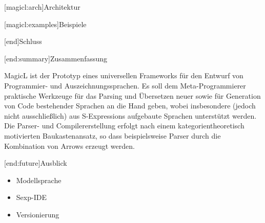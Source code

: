 \documentclass[a4paper, bibgerm]{article}
\newcommand\lsection{}
\newcommand\lsubsection{}
\begin{document}
\lsubsection[magicl:arch]{Architektur}

\lsubsection[magicl:examples]{Beispiele}

\lsection[end]{Schluss}

\lsubsection[end:summary]{Zusammenfassung}

MagicL ist der Prototyp eines
universellen Frameworks für den Entwurf von Programmier- und
Auszeichnungssprachen. Es soll dem Meta-Programmierer praktische
Werkzeuge für das Parsing und Übersetzen neuer sowie für Generation von
Code bestehender Sprachen an die Hand geben, wobei insbesondere (jedoch
nicht ausschließlich) aus S-Expressions aufgebaute Sprachen unterstützt
werden. Die Parser- und Compilererstellung erfolgt nach einem
kategorientheoretisch motivierten Baukastenansatz, so dass
beispielsweise Parser durch die Kombination von Arrows erzeugt werden.

\lsubsection[end:future]{Ausblick}
\begin{itemize}
\item Modellsprache
\item Sexp-IDE
\item Versionierung
\end{itemize}
\end{document}
